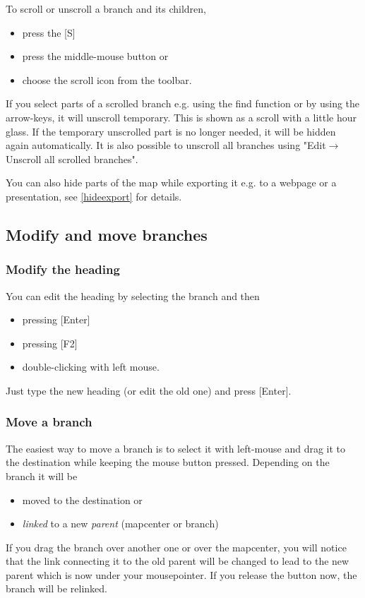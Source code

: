 \documentclass[12pt,a4paper]{article}
\newcommand{\ra}{$\longrightarrow$}
\newcommand{\key}[1]{[#1]}
\begin{document}
To scroll or unscroll a branch and its children,
\begin{itemize}
    \item press the \key{S}
    \item press the middle-mouse button or
    \item choose the scroll icon from the toolbar.
\end{itemize}
If you select parts of a scrolled branch e.g. using the find function or
by using the arrow-keys, it will unscroll temporary. This is shown as a
scroll with a little hour glass. If the temporary unscrolled part is no
longer needed, it will be hidden again automatically. It is also
possible to unscroll all branches using "Edit\ra Unscroll all scrolled
branches".

You can also hide parts of the map while exporting it e.g. to a webpage
or a presentation, see \ref{hideexport} for details.

\subsection{Modify and move branches}
\subsubsection*{Modify the heading}
You can edit the heading by selecting the branch and then
\begin{itemize}
    \item pressing \key{Enter}
    \item pressing \key{F2}
    \item double-clicking with left mouse.
\end{itemize}
Just type the new heading (or edit the old one) and press \key{Enter}.

\subsubsection*{Move a branch}
The easiest way to move a branch is to select it with left-mouse and
drag it to the destination while keeping the mouse button pressed.
Depending on the branch  it will be
\begin{itemize}
    \item moved to the destination or
    \item {\em linked} to a new {\em parent} (mapcenter or branch)
\end{itemize}
If you drag the branch over another one or over the mapcenter, you will
notice that the  link connecting it to the old parent will be changed to
lead to the  new parent which is now under your mousepointer. 
If you release the button now, the branch will be relinked.
\end{document}
